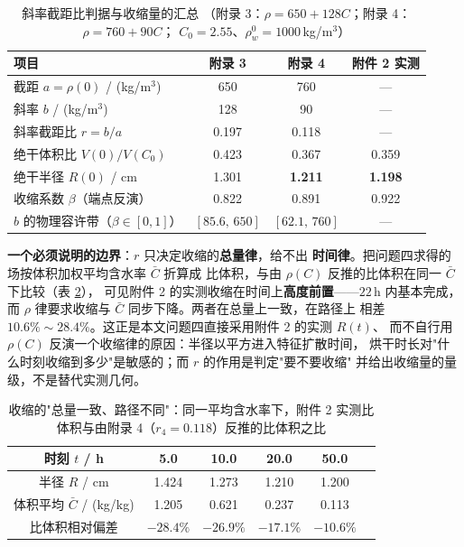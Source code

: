 \documentclass[12pt,a4paper,fontset=none]{ctexart}
\begin{document}
\begin{table}[htb]
  \centering
  \caption{斜率截距比判据与收缩量的汇总
    （附录 3：$\rho=650+128C$；附录 4：$\rho=760+90C$；
    $C_0=2.55$、$\rho_w^0=1000$\,kg/m$^3$）}
  \label{tab:r-crit}
  \small
  \setlength{\tabcolsep}{5pt}
  \begin{tabular}{lccc}
    \toprule
    项目 & 附录 3 & 附录 4 & 附件 2 实测 \\
    \midrule
    截距 $a=\rho(0)$ / (kg/m$^3$) & 650 & 760 & --- \\
    斜率 $b$ / (kg/m$^3$)         & 128 & 90  & --- \\
    斜率截距比 $r=b/a$            & 0.197 & 0.118 & --- \\
    绝干体积比 $V(0)/V(C_0)$      & 0.423 & 0.367 & 0.359 \\
    绝干半径 $R(0)$ / cm          & 1.301 & \textbf{1.211} & \textbf{1.198} \\
    收缩系数 $\beta$（端点反演）  & 0.822 & 0.891 & 0.922 \\
    $b$ 的物理容许带（$\beta\in[0,1]$）
      & $[85.6,\,650]$ & $[62.1,\,760]$ & --- \\
    \bottomrule
  \end{tabular}
\end{table}

\textbf{一个必须说明的边界}：$r$ 只决定收缩的\textbf{总量律}，给不出
\textbf{时间律}。把问题四求得的场按体积加权平均含水率 $\bar C$ 折算成
比体积，与由 $\rho(C)$ 反推的比体积在同一 $\bar C$ 下比较（表 \ref{tab:r-path}），
可见附件 2 的实测收缩在时间上\textbf{高度前置}——$22$\,h 内基本完成，
而 $\rho$ 律要求收缩与 $\bar C$ 同步下降。两者在总量上一致，在路径上
相差 $10.6\%\sim28.4\%$。这正是本文问题四直接采用附件 2 的实测 $R(t)$、
而不自行用 $\rho(C)$ 反演一个收缩律的原因：半径以平方进入特征扩散时间，
烘干时长对"什么时刻收缩到多少"是敏感的；而 $r$ 的作用是判定"要不要收缩"
并给出收缩量的量级，不是替代实测几何。

\begin{table}[htbp]
  \centering
  \caption{收缩的"总量一致、路径不同"：同一平均含水率下，附件 2 实测比
    体积与由附录 4（$r_4=0.118$）反推的比体积之比}
  \label{tab:r-path}
  \small
  \begin{tabular}{cccccc}
    \toprule
    时刻 $t$ / h      & 5.0 & 10.0 & 20.0 & 50.0 \\
    \midrule
    半径 $R$ / cm      & 1.424 & 1.273 & 1.210 & 1.200 \\
    体积平均 $\bar C$ / (kg/kg) & 1.205 & 0.621 & 0.237 & 0.113 \\
    比体积相对偏差      & $-28.4\%$ & $-26.9\%$ & $-17.1\%$ & $-10.6\%$ \\
    \bottomrule
  \end{tabular}
\end{table}
\end{document}
